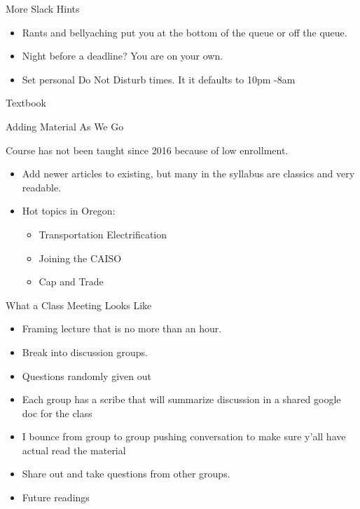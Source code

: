 \documentclass[
  ignorenonframetext,
]{beamer}
\providecommand{\tightlist}{%
  \setlength{\itemsep}{0pt}\setlength{\parskip}{0pt}}
\begin{document}
\begin{frame}{More Slack Hints}
\protect\hypertarget{more-slack-hints}{}

\begin{itemize}
\tightlist
\item
  Rants and bellyaching put you at the bottom of the queue or off the
  queue.
\item
  Night before a deadline? You are on your own.
\item
  Set personal Do Not Disturb times. It it defaults to 10pm -8am
\end{itemize}

\end{frame}

\begin{frame}{Textbook}
\protect\hypertarget{textbook}{}

\end{frame}

\begin{frame}{Adding Material As We Go}
\protect\hypertarget{adding-material-as-we-go}{}

Course has not been taught since 2016 because of low enrollment.

\begin{itemize}
\tightlist
\item
  Add newer articles to existing, but many in the syllabus are classics
  and very readable.
\item
  Hot topics in Oregon:

  \begin{itemize}
  \tightlist
  \item
    Transportation Electrification
  \item
    Joining the CAISO
  \item
    Cap and Trade
  \end{itemize}
\end{itemize}

\end{frame}

\begin{frame}{What a Class Meeting Looks Like}
\protect\hypertarget{what-a-class-meeting-looks-like}{}

\begin{itemize}
\tightlist
\item
  Framing lecture that is no more than an hour.
\item
  Break into discussion groups.
\item
  Questions randomly given out
\item
  Each group has a scribe that will summarize discussion in a shared
  google doc for the class
\item
  I bounce from group to group pushing conversation to make sure y'all
  have actual read the material
\item
  Share out and take questions from other groups.
\item
  Future readings
\end{itemize}

\end{frame}
\end{document}
